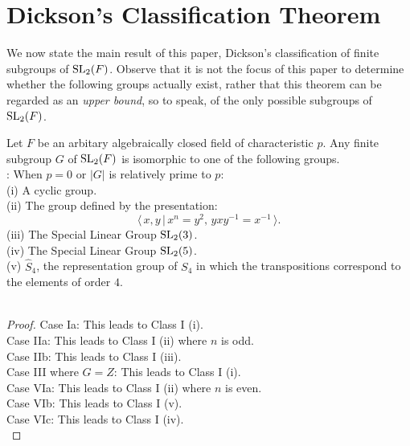 \section{Dickson's Classification Theorem}

We now state the main result of this paper, Dickson's classification of finite subgroups of $\operatorname{SL}_2(F)$. Observe that it is not the focus of this paper to determine whether the following groups actually exist, rather that this theorem can be regarded as an \textit{upper bound}, so to speak, of the only possible subgroups of $\operatorname{SL}_2(F)$.\\

\begin{theorem}[Class I]
    \label{dicksons_classification_theorem_class_I}
    \leanok
    
Let $F$ be an arbitary algebraically closed field of characteristic $p$. Any finite subgroup $G$ of $\operatorname{SL}_2(F)$ is isomorphic to one of the following groups. \vspace{3mm} \\
: When $p=0$ or $|G|$ is relatively prime to $p$: \vspace{1mm} \\
(i) A cyclic group. \vspace{3mm} \\
(ii) The group defined by the presentation:
\begin{equation*} \langle \, x,y \, | \, x^n = y^2, \, yxy^{-1} = x^{-1} \, \rangle.
\end{equation*}
(iii) The Special Linear Group $\operatorname{SL}_2(3)$. \vspace{3mm} \\
(iv) The Special Linear Group $\operatorname{SL}_2(5)$. \vspace{3mm} \\
(v) $\widehat{S}_4$, the representation group of $S_4$ in which the transpositions correspond to the elements of order $4$. \\
\\
\end{theorem}
\begin{proof}
    Case Ia: This leads to Class I (i). \\
    Case IIa: This leads to Class I (ii) where $n$ is odd. \\
    Case IIb: This leads to Class I (iii). \\
    Case III where $G=Z$: This leads to Class I (i).\\
    Case VIa: This leads to Class I (ii) where $n$ is even. \\
    Case VIb: This leads to Class I (v). \\
    Case VIc: This leads to Class I (iv). \\
    
\end{proof}


